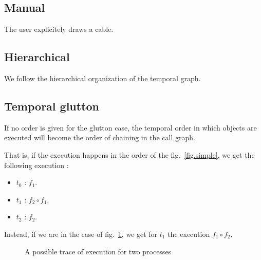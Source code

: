 \documentclass{article}
\begin{document}
    \subsection{Manual}
    The user explicitely draws a cable.
    
    \subsection{Hierarchical}
    We follow the hierarchical organization of the temporal graph.
    
    
    \subsection{Temporal glutton}
    If no order is given for the glutton case, the temporal order in which objects are executed
    will become the order of chaining in the call graph.
    
    That is, if the execution happens in the order of the fig.~\ref{fig.simple}, we get the following execution : 
    
    \begin{itemize}
        \item $t_0$ : $f_1$.
        \item $t_1$ : $f_2 \circ f_1$.
        \item $t_2$ : $f_2$. 
    \end{itemize}

Instead, if we are in the case of fig.~\ref{fig.simple-reversed}, we get for $t_1$ the execution $f_1 \circ f_2$.
    
    \begin{figure}
        \centering
        \caption{A possible trace of execution for two processes}
        \label{fig.simple-reversed}
    \end{figure}
\end{document}
